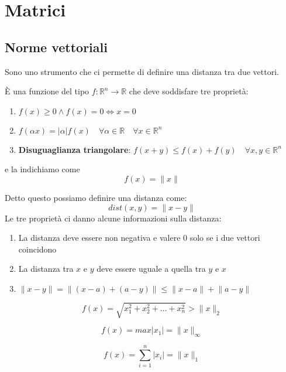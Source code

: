 \newpage
\section{Matrici}

\subsection{Norme vettoriali}
Sono uno strumento che ci permette di definire una distanza tra due vettori.
\begin{definition}
	È una funzione del tipo $f:\mathbb{R}^n \to \mathbb{R}$ che deve soddisfare tre proprietà:
	\begin{enumerate}
		\item $f(x)\geq 0 \wedge f(x)=0 \Leftrightarrow x=0$
		\item $f(\alpha x)=\lvert \alpha \rvert f(x) \quad \forall \alpha \in \mathbb{R} \quad \forall x \in \mathbb{R}^n$
		\item \textbf{Disuguaglianza triangolare}: $f(x+y)\leq f(x)+f(y) \quad \forall x,y \in \mathbb{R}^n$
	\end{enumerate}
	e la indichiamo come
	\begin{equation*}
		f(x) = \lVert x \rVert
	\end{equation*}
\end{definition}

Detto questo possiamo definire una distanza come:
\begin{equation}
	dist(x,y)=\lVert  x-y \rVert
\end{equation}
Le tre proprietà ci danno alcune informazioni sulla distanza:
\begin{enumerate}
	\item La distanza deve essere non negativa e valere $0$ solo se i due vettori coincidono 
	\item La distanza tra $x$ e $y$ deve essere uguale a quella tra $y$ e $x$
	\item $\lVert x-y \rVert = \lVert(x-a)+(a-y)\rVert \leq \lVert x-a \rVert + \lVert a-y \rVert$
\end{enumerate}

\begin{definition}
	\begin{equation}
		f(x) = \sqrt{x_1 ^ 2 + x_2 ^ 2 + \ldots + x_n ^ 2} > \lVert  x \rVert_2
	\end{equation}
\end{definition}
\begin{definition}
	\begin{equation}
		f(x)=max\lvert x_1 \rvert = \lVert x \rVert_{\infty}
	\end{equation}
\end{definition}
\begin{definition}[Norma 1]
	\begin{equation}
		f(x)=\sum_{i=1}^{n}\lvert x_i \rvert = \lVert x\rVert_1
	\end{equation}
\end{definition}

